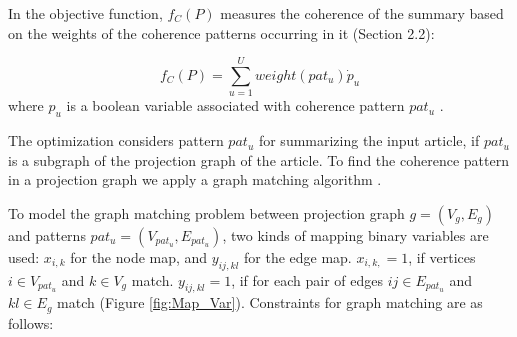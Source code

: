 In the objective function, $f_C(P )$ measures the coherence of the summary based on the weights of the coherence patterns occurring in it (Section 2.2):

\begin{equation}
f_C(P) = \sum_{u=1}^{U}{weight(pat_u) \dot p_u}
\end{equation}
where $p_u$ is a boolean variable associated with coherence pattern $pat_u$ .

The optimization considers pattern $pat_{u}$ for summarizing the input article, if $pat_{u}$ is a subgraph of the projection graph of the article. To find the coherence pattern in a projection graph we apply a graph matching algorithm \cite{lerouge15}.

%
%

To model the graph matching problem between projection graph $g=(V_{g},E_{g})$ and patterns $pat_{u}=(V_{pat_{u}},E_{pat_{u}})$, two kinds of mapping binary variables are used: $x_{i,k}$ for the node map, and $y_{ij,kl}$ for the edge map. $x_{i,k,}=1$, if vertices $i\in V_{pat_{u}}$ and $k\in V_g$ match. $y_{ij,kl}=1$, if for each pair of edges $ij \in E_{pat_{u}}$ and $kl \in E_g$ match (Figure \ref{fig:Map_Var}).
Constraints for graph matching are as follows:

